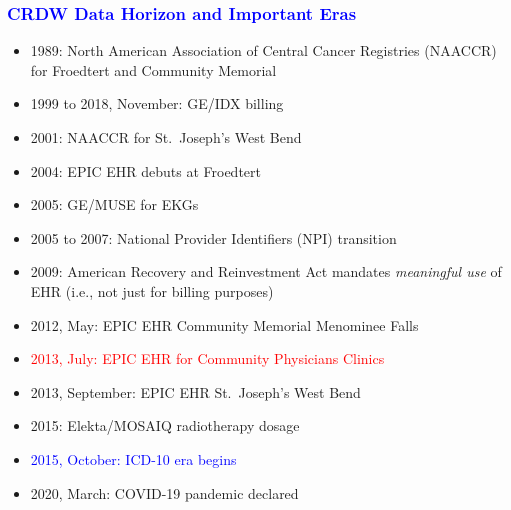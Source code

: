 \documentclass[11pt,pdftex,dvipsnames,usenames]{beamer}
\begin{document}
\begin{frame}[fragile]\frametitle{\bf\textcolor{blue}{CRDW Data Horizon
and Important Eras}}

\begin{itemize}
\item 1989: North American Association of Central Cancer Registries
  (NAACCR) for Froedtert and Community Memorial
\item 1999 to 2018, November: GE/IDX billing
\item 2001: NAACCR for St.\ Joseph's West Bend
\item 2004: EPIC EHR debuts at Froedtert
\item 2005: GE/MUSE for EKGs
\item 2005 to 2007: National Provider Identifiers (NPI) transition
\item 2009: American Recovery and Reinvestment Act mandates {\it meaningful use} of EHR (i.e., not just for billing purposes)
\item 2012, May: EPIC EHR Community Memorial Menominee Falls
\item \textcolor{red}{2013, July: EPIC EHR for Community Physicians Clinics} 
\item 2013, September: EPIC EHR St.\ Joseph's West Bend
\item 2015: Elekta/MOSAIQ radiotherapy dosage
\item \textcolor{blue}{2015, October: ICD-10 era begins}
\item 2020, March: COVID-19 pandemic declared
\end{itemize}

\end{frame}
\end{document}
